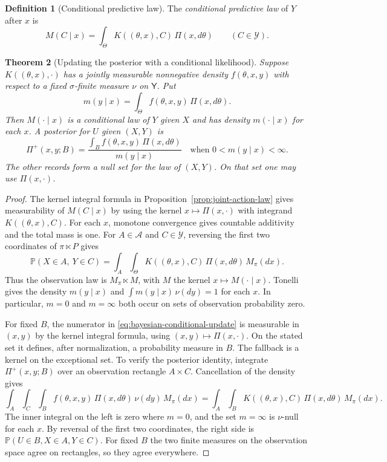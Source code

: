 \documentclass[11pt,oneside]{book}
\newtheorem{theorem}{Theorem}[chapter]
\theoremstyle{definition}
\newtheorem{definition}[theorem]{Definition}
\theoremstyle{remark}
\begin{document}
\begin{definition}[Conditional predictive law]
\label{def:bayesian-conditional-predictive}
The \emph{conditional predictive law} of $Y$ after $x$ is
\[
M(C\mid x)=\int_\Theta K((\theta,x),C)\,\Pi(x,d\theta)
\qquad(C\in\mathcal Y).
\]
\end{definition}

\begin{theorem}[Updating the posterior with a conditional likelihood]
\label{thm:bayesian-conditional-update}
Suppose $K((\theta,x),\cdot)$ has a jointly measurable
nonnegative density $f(\theta,x,y)$ with respect to a fixed
$\sigma$-finite measure $\nu$ on $\mathsf Y$. Put
\[
m(y\mid x)=\int_\Theta f(\theta,x,y)\,\Pi(x,d\theta).
\]
Then $M(\cdot\mid x)$ is a conditional law of $Y$ given $X$ and has
density $m(\cdot\mid x)$ for each $x$. A posterior for $U$ given
$(X,Y)$ is
\begin{equation}
\Pi^+(x,y;B)=
\frac{\int_B f(\theta,x,y)\,\Pi(x,d\theta)}{m(y\mid x)}
\quad\text{when }0<m(y\mid x)<\infty .
\label{eq:bayesian-conditional-update}
\end{equation}
The other records form a null set for the law of $(X,Y)$.
On that set one may use $\Pi(x,\cdot)$.
\end{theorem}
\begin{proof}
The kernel integral formula in Proposition~\ref{prop:joint-action-law}
gives measurability of $M(C\mid x)$ by using the kernel
$x\mapsto\Pi(x,\cdot)$ with integrand $K((\theta,x),C)$.
For each $x$, monotone convergence gives countable additivity and
the total mass is one. For $A\in\mathcal A$ and $C\in\mathcal Y$,
reversing the first two coordinates of $\pi\ltimes P$ gives
\[
\mathbb P(X\in A,\ Y\in C)
=\int_A\int_\Theta K((\theta,x),C)\,\Pi(x,d\theta)\,M_\pi(dx).
\]
Thus the observation law is $M_\pi\ltimes M$, with $M$ the kernel
$x\mapsto M(\cdot\mid x)$. Tonelli gives the density $m(y\mid x)$ and
$\int m(y\mid x)\,\nu(dy)=1$ for each $x$. In particular, $m=0$
and $m=\infty$ both occur on sets of observation probability zero.

For fixed $B$, the numerator in \eqref{eq:bayesian-conditional-update}
is measurable in $(x,y)$ by the kernel integral formula, using
$(x,y)\mapsto\Pi(x,\cdot)$. On the stated set it defines, after
normalization, a probability measure in $B$. The fallback is a
kernel on the exceptional set. To verify the posterior identity,
integrate $\Pi^+(x,y;B)$ over an observation rectangle $A\times C$.
Cancellation of the density gives
\[
\int_A\int_C\int_B f(\theta,x,y)\,\Pi(x,d\theta)\,\nu(dy)\,M_\pi(dx)
=
\int_A\int_B K((\theta,x),C)\,\Pi(x,d\theta)\,M_\pi(dx).
\]
The inner integral on the left is zero where $m=0$, and the set
$m=\infty$ is $\nu$-null for each $x$. By reversal of the first
two coordinates, the right side is $\mathbb P(U\in B,X\in A,Y\in C)$.
For fixed $B$ the two finite measures on the observation space
agree on rectangles, so they agree everywhere.
\end{proof}
\end{document}
